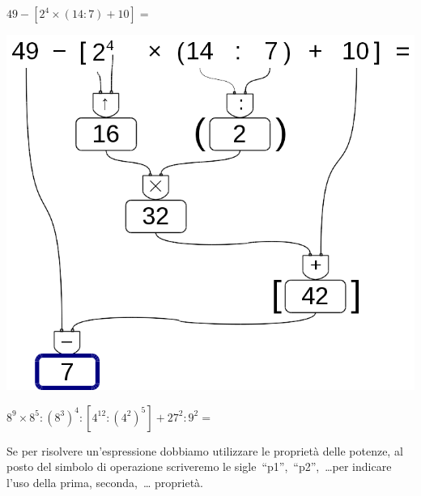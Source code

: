 \begin{exrig}
 \begin{esempio}
  \(49 - [2^4 \times (14 : 7) + 10]=\)
  
\begin{inaccessibleblock}
 \begin{center}
  \includegraphics[scale=0.35]{img/op_espr.png}
 \end{center}
\end{inaccessibleblock}
 \end{esempio}

 \begin{esempio}
  \(8^9 \times 8^5 : (8^3)^4 : [4^{12} : (4^2)^5] + 27^2 : 9^2 =\)
  
  Se per risolvere un'espressione dobbiamo utilizzare le proprietà delle 
  potenze, al posto del simbolo di operazione scriveremo le 
  sigle~``p1'',~``p2'',~\dots per indicare l'uso della prima, seconda,~\dots
  proprietà.
  

\end{esempio}
\end{exrig}
